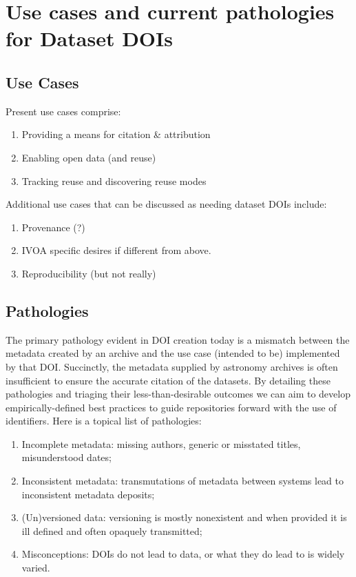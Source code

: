 \documentclass[11pt,a4paper]{ivoa}
\begin{document}
\section{Use cases and current pathologies for Dataset DOIs }

\subsection{Use Cases}
\label{sec:use:cases}

Present use cases comprise:
\begin{enumerate}
\item Providing a means for citation \& attribution
\item Enabling open data (and reuse)
\item Tracking reuse and discovering reuse modes
\end{enumerate}

Additional use cases that can be discussed as needing dataset DOIs include:
\begin{enumerate}
\item Provenance (?)
\item IVOA specific desires if different from above.
\item Reproducibility (but not really)
\end{enumerate}


\subsection{Pathologies}
\label{sec:use:patho}
The primary pathology evident in DOI creation today is a mismatch between the metadata created by an archive and the use case (intended to be) implemented by that DOI. 
Succinctly, the metadata supplied by astronomy archives is often insufficient to ensure the accurate citation of the datasets.
By detailing these pathologies and triaging their less-than-desirable outcomes we can aim to develop empirically-defined best practices to guide repositories forward with the use of identifiers.
Here is a topical list of pathologies:

\begin{enumerate}
\item Incomplete metadata: missing authors, generic or misstated titles, misunderstood dates;
\item Inconsistent metadata: transmutations of metadata between systems lead to inconsistent metadata deposits;
\item (Un)versioned data: versioning is mostly nonexistent and when provided it is ill defined and often opaquely transmitted;
\item Misconceptions: DOIs do not lead to data, or what they do lead to is widely varied.
\end{enumerate}
\end{document}

